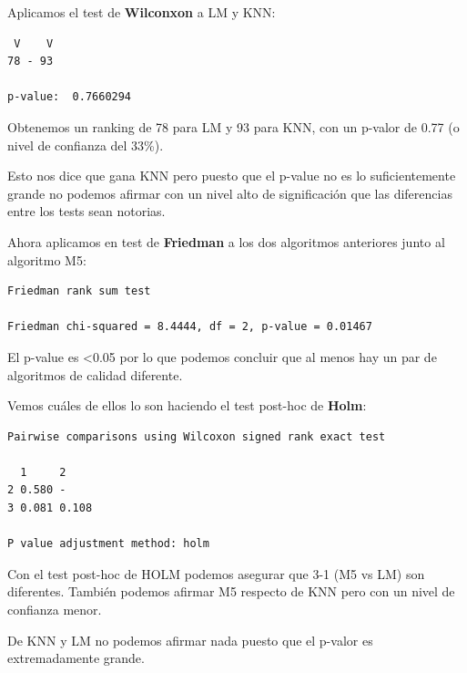 \vspace{\baselineskip}

Aplicamos el test de \textbf{Wilconxon} a LM y KNN:
\begin{verbatim}
 V    V
78 - 93 

p-value:  0.7660294
\end{verbatim}

Obtenemos un ranking de 78 para LM y 93 para KNN, con un p-valor de 0.77 (o nivel de confianza del 33\%).

Esto nos dice que gana KNN pero puesto que el p-value no es lo suficientemente grande no podemos afirmar con un nivel alto de significación que las diferencias entre los tests sean notorias.

\vspace{\baselineskip}

Ahora aplicamos en test de \textbf{Friedman} a los dos algoritmos anteriores junto al algoritmo M5:
\begin{verbatim}
Friedman rank sum test

Friedman chi-squared = 8.4444, df = 2, p-value = 0.01467
\end{verbatim}

El p-value es \textless0.05 por lo que podemos concluir que al menos hay un par de algoritmos de calidad diferente.

\vspace{\baselineskip}

Vemos cuáles de ellos lo son haciendo el test post-hoc de \textbf{Holm}:
\begin{verbatim}
Pairwise comparisons using Wilcoxon signed rank exact test 

  1     2    
2 0.580 -    
3 0.081 0.108

P value adjustment method: holm 
\end{verbatim}

Con el test post-hoc de HOLM podemos asegurar que 3-1 (M5 vs LM) son diferentes. También podemos afirmar M5 respecto de KNN pero con un nivel de confianza menor.

\vspace{\baselineskip}

De KNN y LM no podemos afirmar nada puesto que el p-valor es extremadamente grande.